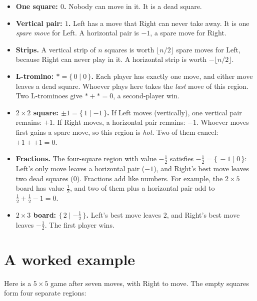 \documentclass[11pt,a4paper]{article}
\newcommand{\dm}{\mathbin{\vert}}  %
\newcommand{\game}[2]{\{\,#1 \dm #2\,\}}
\begin{document}
\begin{itemize}
  \item \textbf{One square: $0$.}  Nobody can move in it.  It is a dead square.
  \item \textbf{Vertical pair: $1$.}  Left has a move that Right can never take away.  It is one
        \emph{spare move} for Left.  A horizontal pair is $-1$, a spare move for Right.
  \item \textbf{Strips.}  A vertical strip of $n$ squares is worth $\lfloor n/2\rfloor$ spare
        moves for Left, because Right can never play in it.  A horizontal strip is worth
        $-\lfloor n/2\rfloor$.
  \item \textbf{L-tromino: $* = \game{0}{0}$.}  Each player has exactly one move, and either move
        leaves a dead square.  Whoever plays here takes the \emph{last} move of this region.  Two
        L-trominoes give $*+*=0$, a second-player win.
  \item \textbf{$2\times2$ square: $\pm1 = \game{1}{-1}$.}  If Left moves (vertically), one
        vertical pair remains: $+1$.  If Right moves, a horizontal pair remains: $-1$.  Whoever
        moves first gains a spare move, so this region is \emph{hot}.  Two of them cancel:
        $\pm1 + \pm1 = 0$.
  \item \textbf{Fractions.}  The four-square region with value $-\tfrac12$ satisfies
        $-\tfrac12 = \game{-1}{0}$: Left's only move leaves a horizontal pair ($-1$), and Right's
        best move leaves two dead squares ($0$).  Fractions add like numbers.  For example, the
        $2\times5$ board has value $\tfrac12$, and two of them plus a horizontal pair add to
        $\tfrac12+\tfrac12-1=0$.
  \item \textbf{$2\times3$ board: $\game{2}{-\tfrac12}$.}  Left's best move leaves $2$, and
        Right's best move leaves $-\tfrac12$.  The first player wins.
\end{itemize}

\section{A worked example}

Here is a $5\times5$ game after seven moves, with Right to move.  The empty squares form four
separate regions:
\end{document}

